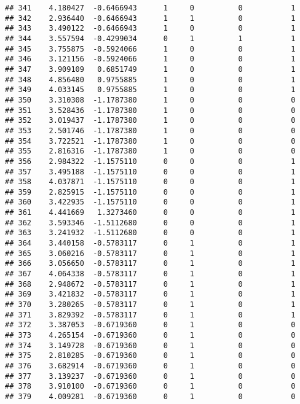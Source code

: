 \documentclass[
]{article}
\begin{document}
\begin{verbatim}
## 341    4.180427  -0.6466943      1     0          0           1
## 342    2.936440  -0.6466943      1     1          0           1
## 343    3.490122  -0.6466943      1     0          0           1
## 344    3.557594  -0.4299034      0     1          1           1
## 345    3.755875  -0.5924066      1     0          0           1
## 346    3.121156  -0.5924066      1     0          0           1
## 347    3.909109   0.6851749      1     0          0           1
## 348    4.856480   0.9755885      1     0          0           1
## 349    4.033145   0.9755885      1     0          0           1
## 350    3.310308  -1.1787380      1     0          0           0
## 351    3.528436  -1.1787380      1     0          0           0
## 352    3.019437  -1.1787380      1     0          0           0
## 353    2.501746  -1.1787380      1     0          0           0
## 354    3.722521  -1.1787380      1     0          0           0
## 355    2.816316  -1.1787380      1     0          0           0
## 356    2.984322  -1.1575110      0     0          0           1
## 357    3.495188  -1.1575110      0     0          0           1
## 358    4.037871  -1.1575110      0     0          0           1
## 359    2.825915  -1.1575110      0     0          0           1
## 360    3.422935  -1.1575110      0     0          0           1
## 361    4.441669   1.3273460      0     0          0           1
## 362    3.593346  -1.5112680      0     0          0           1
## 363    3.241932  -1.5112680      0     0          0           1
## 364    3.440158  -0.5783117      0     1          0           1
## 365    3.060216  -0.5783117      0     1          0           1
## 366    3.056650  -0.5783117      0     1          0           1
## 367    4.064338  -0.5783117      0     1          0           1
## 368    2.948672  -0.5783117      0     1          0           1
## 369    3.421832  -0.5783117      0     1          0           1
## 370    3.280265  -0.5783117      0     1          0           1
## 371    3.829392  -0.5783117      0     1          0           1
## 372    3.387053  -0.6719360      0     1          0           0
## 373    4.265154  -0.6719360      0     1          0           0
## 374    3.149728  -0.6719360      0     1          0           0
## 375    2.810285  -0.6719360      0     1          0           0
## 376    3.682914  -0.6719360      0     1          0           0
## 377    3.139237  -0.6719360      0     1          0           0
## 378    3.910100  -0.6719360      0     1          0           0
## 379    4.009281  -0.6719360      0     1          0           0

\end{verbatim}
\end{document}
